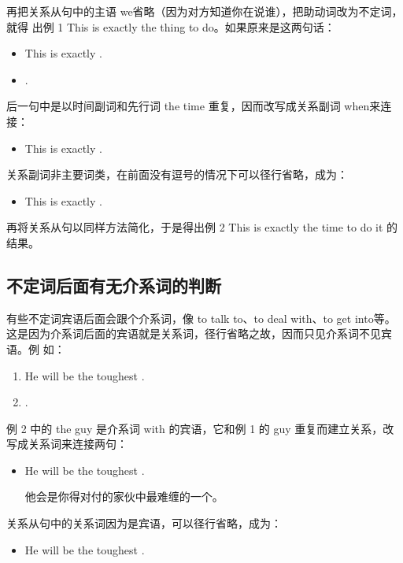 再把关系从句中的主语 we省略（因为对方知道你在说谁），把助动词改为不定词，就得
出例 1 This is exactly the thing to do。如果原来是这两句话：
\begin{itemize}
\item This is exactly .
\item {}   .
\end{itemize}

后一句中是以时间副词和先行词 the time 重复，因而改写成关系副词 when来连接：
\begin{itemize}
\item This is exactly  .
\end{itemize}

关系副词非主要词类，在前面没有逗号的情况下可以径行省略，成为：
\begin{itemize}
\item This is exactly  .
\end{itemize}
再将关系从句以同样方法简化，于是得出例 2 This is exactly the time to do it 的
结果。

\subsection{不定词后面有无介系词的判断}

有些不定词宾语后面会跟个介系词，像 to talk to、to deal with、to get into等。
这是因为介系词后面的宾语就是关系词，径行省略之故，因而只见介系词不见宾语。例
如：
\begin{enumerate}
\item He will be the toughest .
\item {}   .
\end{enumerate}
例 2 中的 the guy 是介系词 with 的宾语，它和例 1 的 guy
重复而建立关系，改写成关系词来连接两句：
\begin{itemize}
\item He will be the toughest  .

  他会是你得对付的家伙中最难缠的一个。
\end{itemize}

关系从句中的关系词因为是宾语，可以径行省略，成为：
\begin{itemize}
\item He will be the toughest  .
\end{itemize}

